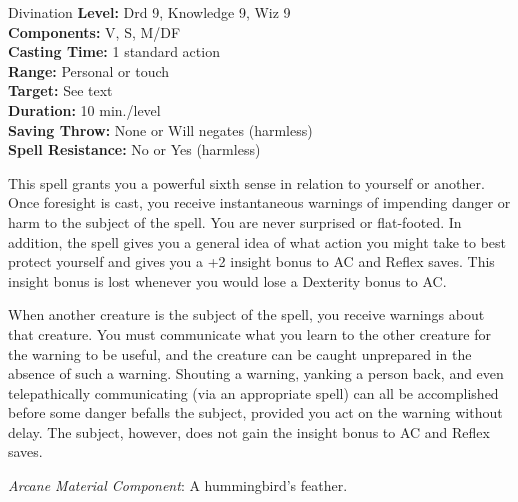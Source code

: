 {Divination}
{
	\textbf{Level:}
	Drd 9, Knowledge 9, Wiz 9\\
	\textbf{Components:}
	V, S, M/DF\\
	\textbf{Casting Time:}
	1 standard action\\
	\textbf{Range:}
	Personal or touch\\
	\textbf{Target:}
	See text\\
	\textbf{Duration:}
	10 min./level\\
	\textbf{Saving Throw:}
	None or Will negates (harmless)\\
	\textbf{Spell Resistance:}
	No or Yes (harmless)\\
}
{
	This spell grants you a powerful sixth sense in relation to yourself or another. Once foresight is cast, you receive instantaneous warnings of impending danger or harm to the subject of the spell. You are never surprised or flat-footed. In addition, the spell gives you a general idea of what action you might take to best protect yourself and gives you a +2 insight bonus to AC and Reflex saves. This insight bonus is lost whenever you would lose a Dexterity bonus to AC.

	When another creature is the subject of the spell, you receive warnings about that creature. You must communicate what you learn to the other creature for the warning to be useful, and the creature can be caught unprepared in the absence of such a warning. Shouting a warning, yanking a person back, and even telepathically communicating (via an appropriate spell) can all be accomplished before some danger befalls the subject, provided you act on the warning without delay. The subject, however, does not gain the insight bonus to AC and Reflex saves.

	\textit{Arcane Material Component}:
	A hummingbird's feather.

}
